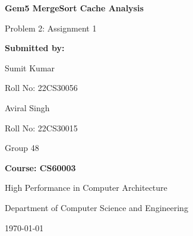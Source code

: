 \documentclass[12pt,a4paper]{article}
\begin{document}
\begin{titlepage}
    \centering
    \vspace*{1.5cm}

    {\Huge\bfseries Gem5 MergeSort Cache Analysis\par}
    \vspace{0.5cm}
    \vspace{1.5cm}

    {\LARGE Problem 2: Assignment 1\par}
    \vspace{2.5cm}

    {\Large\bfseries Submitted by:\par}
    \vspace{0.5cm}
    {\Large Sumit Kumar\par}
    {\large Roll No: 22CS30056\par}
    \vspace{0.5cm}
    {\Large Aviral Singh\par}
    {\large Roll No: 22CS30015\par}
    {\Large Group 48\par}
    \vspace{3cm}

    {\large\bfseries Course: CS60003\par}
    {\Large High Performance in Computer Architecture\par}
    \vspace{0.5cm}
    {\large Department of Computer Science and Engineering\par}

    \vfill
    {\large \today\par}
\end{titlepage}
\end{document}
